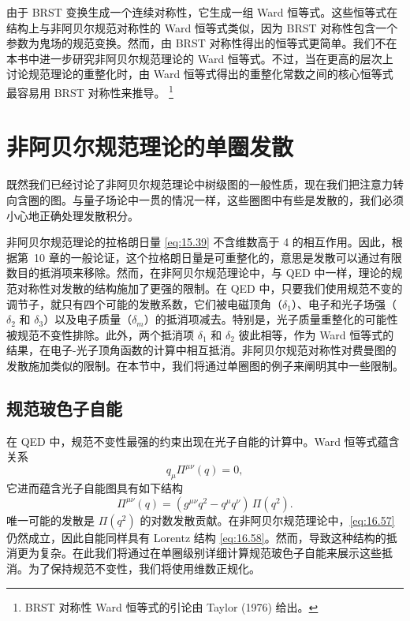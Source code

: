 由于 BRST 变换生成一个连续对称性，它生成一组 Ward 恒等式。这些恒等式在结构上与非阿贝尔规范对称性的 Ward 恒等式类似，因为 BRST 对称性包含一个参数为鬼场的规范变换。然而，由 BRST 对称性得出的恒等式更简单。我们不在本书中进一步研究非阿贝尔规范理论的 Ward 恒等式。不过，当在更高的层次上讨论规范理论的重整化时，由 Ward 恒等式得出的重整化常数之间的核心恒等式最容易用 BRST 对称性来推导。%
\footnote{BRST 对称性 Ward 恒等式的引论由 Taylor (1976) 给出。}

\section{非阿贝尔规范理论的单圈发散}

既然我们已经讨论了非阿贝尔规范理论中树级图的一般性质，现在我们把注意力转向含圈的图。与量子场论中一贯的情况一样，这些圈图中有些是发散的，我们必须小心地正确处理发散积分。

非阿贝尔规范理论的拉格朗日量 \eqref{eq:15.39} 不含维数高于 4 的相互作用。因此，根据第~10 章的一般论证，这个拉格朗日量是可重整化的，意思是发散可以通过有限数目的抵消项来移除。然而，在非阿贝尔规范理论中，与 QED 中一样，理论的规范对称性对发散的结构施加了更强的限制。在 QED 中，只要我们使用规范不变的调节子，就只有四个可能的发散系数，它们被电磁顶角（$\delta_1$）、电子和光子场强（$\delta_2$ 和 $\delta_3$）以及电子质量（$\delta_m$）的抵消项减去。特别是，光子质量重整化的可能性被规范不变性排除。此外，两个抵消项 $\delta_1$ 和 $\delta_2$ 彼此相等，作为 Ward 恒等式的结果，在电子-光子顶角函数的计算中相互抵消。非阿贝尔规范对称性对费曼图的发散施加类似的限制。在本节中，我们将通过单圈图的例子来阐明其中一些限制。

\subsection{规范玻色子自能}

在 QED 中，规范不变性最强的约束出现在光子自能的计算中。Ward 恒等式蕴含关系
\begin{equation}
  q_\mu\Pi^{\mu\nu}(q) = 0 ,
  \label{eq:16.57}
\end{equation}
它进而蕴含光子自能图具有如下结构
\begin{equation}
  \Pi^{\mu\nu}(q) = (g^{\mu\nu}q^2 - q^\mu q^\nu)\,\Pi(q^2) .
  \label{eq:16.58}
\end{equation}
唯一可能的发散是 $\Pi(q^2)$ 的对数发散贡献。在非阿贝尔规范理论中，\eqref{eq:16.57} 仍然成立，因此自能同样具有 Lorentz 结构 \eqref{eq:16.58}。然而，导致这种结构的抵消更为复杂。在此我们将通过在单圈级别详细计算规范玻色子自能来展示这些抵消。为了保持规范不变性，我们将使用维数正规化。

